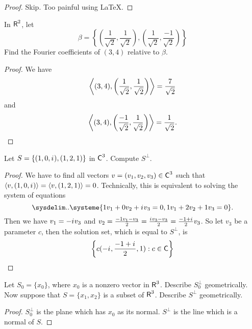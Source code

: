 \begin{proof}
Skip. Too painful using \LaTeX.
\end{proof}

\begin{exercise} \label{exercise 6.2.3}
In \(\textsf{R}^2\), let
\[
    \beta = \left\{
        \left( \frac{1}{\sqrt{2}}, \frac{1}{\sqrt{2}} \right), \left( \frac{1}{\sqrt{2}}, \frac{-1}{\sqrt{2}} \right)
    \right\}
\]
Find the Fourier coefficients of \((3, 4)\) relative to \(\beta\).
\end{exercise}

\begin{proof}
We have
\[
    \left< (3, 4) , \left( \frac{1}{\sqrt{2}}, \frac{1}{\sqrt{2}} \right) \right> = \frac{7}{\sqrt{2}}
\]
and
\[
    \left< (3, 4) , \left( \frac{-1}{\sqrt{2}}, \frac{1}{\sqrt{2}} \right) \right> = \frac{1}{\sqrt{2}}.
\]
\end{proof}

\begin{exercise} \label{exercise 6.2.4}
Let \(S = \{ (1, 0, {i\mkern1mu}), (1, 2, 1) \}\) in \(\textsf{C}^3\). Compute \(S^{\perp}\).
\end{exercise}

\begin{proof}
We have to find all vectors \(v = (v_1, v_2, v_3) \in \textsf{C}^3\) such that \(\left< v, (1, 0, {i\mkern1mu}) \right> = \left< v, (1, 2, 1) \right> = 0\).
Technically, this is equivalent to solving the system of equations
\[
    \sysdelim..\systeme{
        1 v_1 + 0 v_2 + \iu v_3 = 0,
        1 v_1 + 2 v_2 + 1 v_3 = 0
    }.
\]
Then we have \(v_1 = -{i\mkern1mu} v_3\) and \(v_2 = \frac{-1 v_1 - v_3}{2} = \frac{{i\mkern1mu} v_3 - v_3}{2} = \frac{-1 + {i\mkern1mu}}{2} v_3\).
So let \(v_3\) be a parameter \(c\), then the solution set, which is equal to \(S^{\perp}\), is
\[
    \left\{ c (-{i\mkern1mu}, \frac{-1 + {i\mkern1mu}}{2}, 1) : c \in \textsf{C} \right\}
\]
\end{proof}

\begin{exercise} \label{exercise 6.2.5}
Let \(S_0 = \{ x_0 \}\), where \(x_0\) is a nonzero vector in \(\textsf{R}^3\).
Describe \(S_0^{\perp}\) geometrically.
Now suppose that \(S = \{ x_1, x_2 \}\) is a \LID{} subset of \(\textsf{R}^3\).
Describe \(S^{\perp}\) geometrically.
\end{exercise}

\begin{proof}
\(S_0^{\perp}\) is the plane which has \(x_0\) as its normal.
\(S^{\perp}\) is the line which is a normal of \(S\).
\end{proof}

